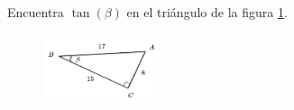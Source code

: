 Encuentra $\tan(\beta)$ en el triángulo de la figura \ref{fig:functrig14}.
\begin{figure}[H]
    \begin{center}
        \includegraphics[width=0.3\textwidth]{../images/functrig14.png}
    \end{center}
    \caption{}
    \label{fig:functrig14}
\end{figure}
